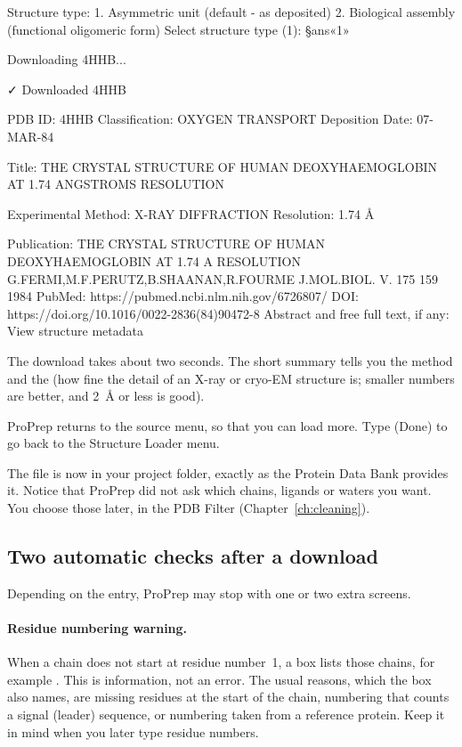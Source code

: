 \begin{steps}
\begin{screen}
Structure type:
  1. Asymmetric unit (default - as deposited)
  2. Biological assembly (functional oligomeric form)
Select structure type (1): §ans«1»

Downloading 4HHB...

✓ Downloaded 4HHB

PDB ID: 4HHB
Classification: OXYGEN TRANSPORT
Deposition Date: 07-MAR-84

Title: THE CRYSTAL STRUCTURE OF HUMAN DEOXYHAEMOGLOBIN AT 1.74 ANGSTROMS
RESOLUTION

Experimental Method: X-RAY DIFFRACTION
Resolution: 1.74 Å

Publication:
  THE CRYSTAL STRUCTURE OF HUMAN DEOXYHAEMOGLOBIN AT 1.74 A RESOLUTION
  G.FERMI,M.F.PERUTZ,B.SHAANAN,R.FOURME
  J.MOL.BIOL. V. 175 159 1984
  PubMed: https://pubmed.ncbi.nlm.nih.gov/6726807/
  DOI: https://doi.org/10.1016/0022-2836(84)90472-8
  Abstract and free full text, if any: View structure metadata
\end{screen}
        The download takes about two seconds. The short summary tells you the
        method and the  (how fine the detail of an X-ray or
        cryo-EM structure is; smaller numbers are better, and 2~Å or less is
        good).
  \item ProPrep returns to the source menu, so that you can load more. Type
         (Done) to go back to the Structure Loader menu.
\end{steps}

The file  is now in your project folder, exactly as the Protein
Data Bank provides it. Notice that ProPrep did not ask which chains, ligands or
waters you want. You choose those later, in the PDB Filter
(Chapter~\ref{ch:cleaning}).

\subsection{Two automatic checks after a download}

Depending on the entry, ProPrep may stop with one or two extra screens.

\paragraph{Residue numbering warning.} When a chain does not start at residue
number~1, a box lists those chains, for example
. This is information, not an error.
The usual reasons, which the box also names, are missing residues at the start
of the chain, numbering that counts a signal (leader) sequence, or numbering
taken from a reference protein. Keep it in mind when you later type residue
numbers.


